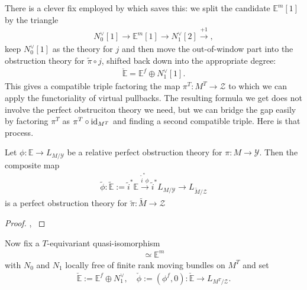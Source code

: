 \documentclass[12pt,dvipsnames]{amsart}
\begin{document}
There is a clever fix employed by \cite{chang-kiem-li_TorusLocalizationWall2017} which saves this: we split the candidate \(\mathbb E^m[1]\) by the triangle
\begin{align*}
  N^\vee_0[1] \to \mathbb E^m[1] \to N^\vee_1[2] \xrightarrow{+1},
\end{align*}
keep \(N^\vee_0[1]\) as the theory for \(j\) and then move the out-of-window part into the obstruction theory for \(\widetilde \pi \circ j\), shifted back down into the appropriate degree:
\begin{align*}
  \check{\mathbb E} = \mathbb E^f\oplus N^\vee_1[1].
\end{align*}
This gives a compatible triple factoring the map \(\pi^T:M^T\to \mathcal Z\) to which we can apply the functoriality of virtual pullbacks. The resulting formula we get does not involve the perfect obstruciton theory we need, but we can bridge the gap easily by factoring \(\pi^T\) as \(\pi^T\circ \operatorname{id}_{M^T}\) and finding a second compatible triple. Here is that process.

\begin{lem}\label{rl-0017}\label{lem:obstruction-theory-for-tilde-M}
  Let \(\phi:\mathbb E\to L_{M/\mathcal Y}\) be a relative perfect obstruction theory for \(\pi:M\to \mathcal Y\). Then the composite map
  \begin{align*}
    \widetilde \phi:\widetilde{\mathbb E} := \tilde i^*\mathbb E \xrightarrow{\tilde i^*\phi} \widetilde i^*L_{M/\mathcal Y} \to L_{\widetilde M/\mathcal Z}
  \end{align*}
  is a perfect obstruction theory for \(\tilde \pi:\widetilde M\to \mathcal Z\)
\end{lem}
\begin{proof}
  \cite[Prop. 7.2]{behrend-fantechi_IntrinsicNormalCone1997}, \cite[Theorem 4.3]{manolache_VirtualPullbacks2012}

\end{proof}

Now fix a $T$-equivariant quasi-isomorphism
\begin{align*}
  [N^\vee_1\xrightarrow{d^\vee} N^\vee_0] \simeq \mathbb E^m \tag{degrees -1, 0}
\end{align*}
with \(N_0\) and \(N_1\) locally free of finite rank moving bundles on \(M^T\) and set
\begin{align*}
  \check{\mathbb E} := \mathbb E^f\oplus N^\vee_1, \quad \check \phi:= (\phi^f, 0):\check{\mathbb E} \to L_{M^T/\mathcal Z}.
\end{align*}
\end{document}

